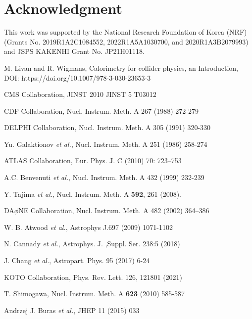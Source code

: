 \documentclass[12pt,times,draftclsnofoot,a4paper]{elsarticle}
\begin{document}
\label{sec:con}


\section*{Acknowledgment}
This work was supported by the National Research Foundation of Korea (NRF) 
(Grants No. 2019R1A2C1084552, 2022R1A5A1030700, and 2020R1A3B2079993) and JSPS KAKENHI Grant No. JP21H01118.

\begin{thebibliography}{99}
 
M. Livan and R. Wigmans, Calorimetry for collider physics, an Introduction, DOI: https://doi.org/10.1007/978-3-030-23653-3
 
CMS Collaboration, JINST 2010 JINST 5 T03012

CDF Collaboration, Nucl. Instrum. Meth. A 267 (1988) 272-279
 
DELPHI Collaboration, Nucl. Instrum. Meth. A 305 (1991) 320-330

Yu. Galaktionov {\it et al.}, Nucl. Instrum. Meth. A 251 (1986) 258-274

ATLAS Collaboration, Eur. Phys. J. C (2010) 70: 723–753

A.C. Benvenuti {\it et al.}, Nucl. Instrum. Meth. A 432 (1999) 232-239

Y. Tajima {\it et al.}, Nucl. Instrum. Meth. A {\bf 592}, 261 (2008).

DA$\phi$NE Collaboration, Nucl. Instrum. Meth. A 482 (2002) 364–386

W. B. Atwood {\it et al.}, Astrophys J.697 (2009) 1071-1102

N. Cannady {\it et al.}, Astrophys. J. ,Suppl. Ser. 238:5 (2018) 

J. Chang {\it et al.}, Astropart. Phys. 95 (2017) 6-24

KOTO Collaboration, Phys. Rev. Lett. 126, 121801 (2021)
 
T. Shimogawa, Nucl. Instrum. Meth. A {\bf 623} (2010) 585-587

Andrzej J. Buras {\it et al.}, JHEP 11 (2015) 033


\end{thebibliography}
\end{document}
